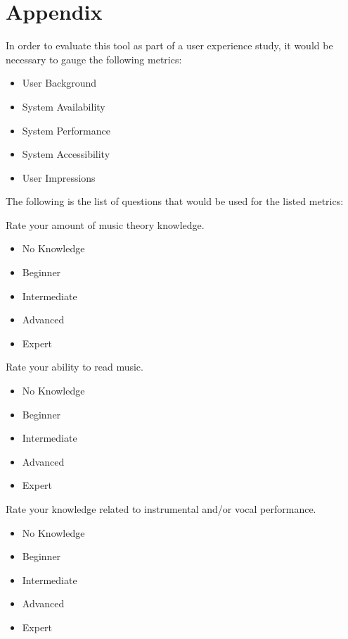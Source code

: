 \chapter*{Appendix}
\label{ch:appendix}

\noindent In order to evaluate this tool as part of a user experience study, it would be necessary to gauge the following metrics:

\begin{itemize}
	\item User Background
	\item System Availability
	\item System Performance
	\item System Accessibility
	\item User Impressions
\end{itemize}

\noindent The following is the list of questions that would be used for the listed metrics:

\vspace{\baselineskip}

\noindent Rate your amount of music theory knowledge.

\begin{itemize}
	\item No Knowledge
	\item Beginner
	\item Intermediate
	\item Advanced
	\item Expert
\end{itemize}

\noindent Rate your ability to read music.

\begin{itemize}
	\item No Knowledge
	\item Beginner
	\item Intermediate
	\item Advanced
	\item Expert
\end{itemize}

\noindent Rate your knowledge related to instrumental and/or vocal performance.

\begin{itemize}
	\item No Knowledge
	\item Beginner
	\item Intermediate
	\item Advanced
	\item Expert
\end{itemize}

